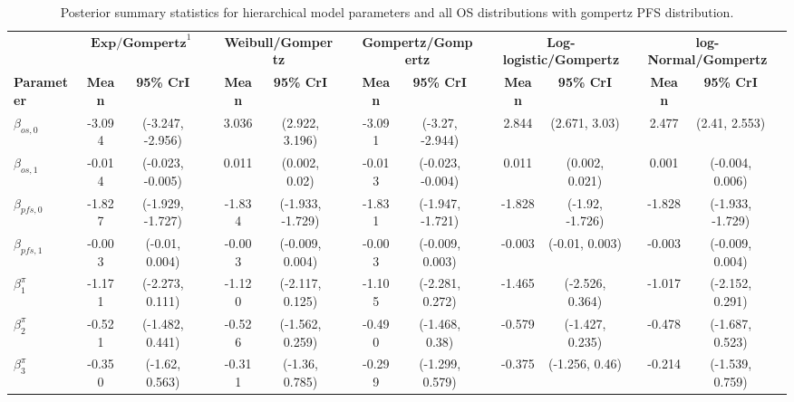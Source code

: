 \documentclass[AMA,STIX1COL]{WileyNJD-v2}
\begin{document}
\begin{landscape}
\begin{center}
\begin{table}[t]
\caption{Posterior summary statistics for hierarchical model parameters and all OS distributions with gompertz PFS distribution. \label{tab:post_hier_pfs_gompertz}}
\centering
\begin{tabular}{l c c c c c c c c c c c c c c c}
\toprule
\multicolumn{1}{l}{} & \multicolumn{2}{c}{$\textbf{Exp/Gompertz}^1$} & & \multicolumn{2}{c}{\textbf{Weibull/Gompertz}} & & \multicolumn{2}{c}{\textbf{Gompertz/Gompertz}} & & \multicolumn{2}{c}{\textbf{Log-logistic/Gompertz}} & & \multicolumn{2}{c}{\textbf{log-Normal/Gompertz}}\\
\cmidrule{2-3}\cmidrule{5-6}\cmidrule{8-9}\cmidrule{11-12}\cmidrule{14-15}
\textbf{Parameter} & \textbf{Mean} & \textbf{95\% CrI} & & \textbf{Mean} & \textbf{95\% CrI} & & \textbf{Mean} & \textbf{95\% CrI} & & \textbf{Mean} & \textbf{95\% CrI} & & \textbf{Mean} & \textbf{95\% CrI}\\
\midrule
$\beta_{os, 0}$ & -3.094 & (-3.247, -2.956) &  & 3.036 & (2.922, 3.196) &  & -3.091 & (-3.27, -2.944) &  & 2.844 & (2.671, 3.03) &  & 2.477 & (2.41, 2.553) & \\
$\beta_{os, 1}$ & -0.014 & (-0.023, -0.005) &  & 0.011 & (0.002, 0.02) &  & -0.013 & (-0.023, -0.004) &  & 0.011 & (0.002, 0.021) &  & 0.001 & (-0.004, 0.006) & \\
$\beta_{pfs, 0}$ & -1.827 & (-1.929, -1.727) &  & -1.834 & (-1.933, -1.729) &  & -1.831 & (-1.947, -1.721) &  & -1.828 & (-1.92, -1.726) &  & -1.828 & (-1.933, -1.729) & \\
$\beta_{pfs, 1}$ & -0.003 & (-0.01, 0.004) &  & -0.003 & (-0.009, 0.004) &  & -0.003 & (-0.009, 0.003) &  & -0.003 & (-0.01, 0.003) &  & -0.003 & (-0.009, 0.004) & \\
$\beta^{\pi}_1$ & -1.171 & (-2.273, 0.111) &  & -1.120 & (-2.117, 0.125) &  & -1.105 & (-2.281, 0.272) &  & -1.465 & (-2.526, 0.364) &  & -1.017 & (-2.152, 0.291) & \\
$\beta^{\pi}_2$ & -0.521 & (-1.482, 0.441) &  & -0.526 & (-1.562, 0.259) &  & -0.490 & (-1.468, 0.38) &  & -0.579 & (-1.427, 0.235) &  & -0.478 & (-1.687, 0.523) & \\
$\beta^{\pi}_3$ & -0.350 & (-1.62, 0.563) &  & -0.311 & (-1.36, 0.785) &  & -0.299 & (-1.299, 0.579) &  & -0.375 & (-1.256, 0.46) &  & -0.214 & (-1.539, 0.759) & \\

\end{tabular}
\end{table}
\end{center}
\end{landscape}
\end{document}
